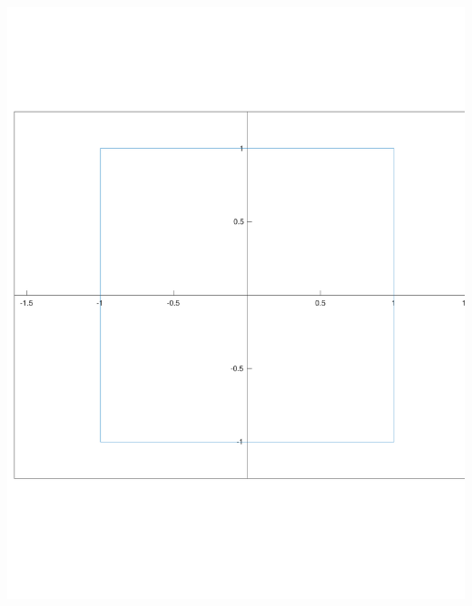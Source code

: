 \documentclass[]{article}
\begin{document}
\begin{enumerate}[resume]
    \begin{center}
      \includegraphics[scale=0.5]{unit_sphere_supnorm.pdf}
    \end{center}



\end{enumerate}
\end{document}
